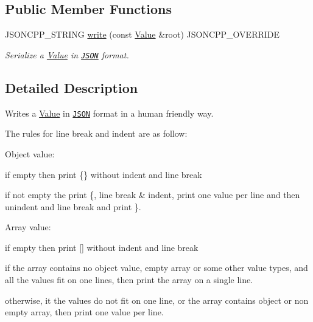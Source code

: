 \subsection*{Public Member Functions}
\begin{DoxyCompactItemize}
\item 
J\+S\+O\+N\+C\+P\+P\+\_\+\+S\+T\+R\+I\+NG \hyperlink{class_json_1_1_styled_writer_a5efab19b9746da9920c29cdae3a6b404}{write} (const \hyperlink{class_json_1_1_value}{Value} \&root) J\+S\+O\+N\+C\+P\+P\+\_\+\+O\+V\+E\+R\+R\+I\+DE
\begin{DoxyCompactList}\small\item\em Serialize a \hyperlink{class_json_1_1_value}{Value} in \href{http://www.json.org}{\tt J\+S\+ON} format. \end{DoxyCompactList}\end{DoxyCompactItemize}


\subsection{Detailed Description}
Writes a \hyperlink{class_json_1_1_value}{Value} in \href{http://www.json.org}{\tt J\+S\+ON} format in a human friendly way. 

The rules for line break and indent are as follow\+:
\begin{DoxyItemize}
\item Object value\+:
\begin{DoxyItemize}
\item if empty then print \{\} without indent and line break
\item if not empty the print \textquotesingle{}\{\textquotesingle{}, line break \& indent, print one value per line and then unindent and line break and print \textquotesingle{}\}\textquotesingle{}.
\end{DoxyItemize}
\item Array value\+:
\begin{DoxyItemize}
\item if empty then print \mbox{[}\mbox{]} without indent and line break
\item if the array contains no object value, empty array or some other value types, and all the values fit on one lines, then print the array on a single line.
\item otherwise, it the values do not fit on one line, or the array contains object or non empty array, then print one value per line.
\end{DoxyItemize}
\end{DoxyItemize}

